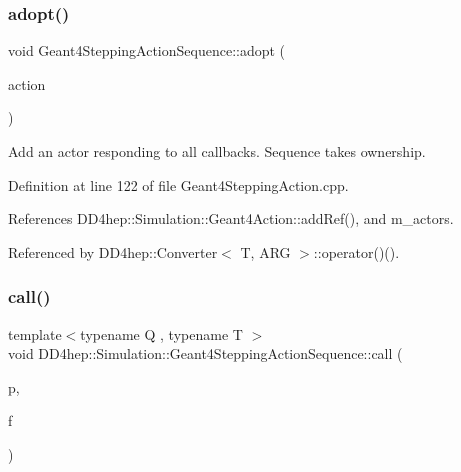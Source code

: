\subsubsection{\texorpdfstring{adopt()}{adopt()}}
{\footnotesize\ttfamily void Geant4\+Stepping\+Action\+Sequence\+::adopt (\begin{DoxyParamCaption}\item[{\hyperlink{class_d_d4hep_1_1_simulation_1_1_geant4_stepping_action}{Geant4\+Stepping\+Action} $\ast$}]{action }\end{DoxyParamCaption})}



Add an actor responding to all callbacks. Sequence takes ownership. 



Definition at line 122 of file Geant4\+Stepping\+Action.\+cpp.



References D\+D4hep\+::\+Simulation\+::\+Geant4\+Action\+::add\+Ref(), and m\+\_\+actors.



Referenced by D\+D4hep\+::\+Converter$<$ T, A\+R\+G $>$\+::operator()().

\hypertarget{class_d_d4hep_1_1_simulation_1_1_geant4_stepping_action_sequence_a7f5c29121e2d8bb99bf2a894690c70ad}{}\label{class_d_d4hep_1_1_simulation_1_1_geant4_stepping_action_sequence_a7f5c29121e2d8bb99bf2a894690c70ad} 
\subsubsection{\texorpdfstring{call()}{call()}}
{\footnotesize\ttfamily template$<$typename Q , typename T $>$ \\
void D\+D4hep\+::\+Simulation\+::\+Geant4\+Stepping\+Action\+Sequence\+::call (\begin{DoxyParamCaption}\item[{Q $\ast$}]{p,  }\item[{void(T\+::$\ast$)(const G4\+Step $\ast$, G4\+Stepping\+Manager $\ast$)}]{f }\end{DoxyParamCaption})\hspace{0.3cm}{\ttfamily [inline]}}



